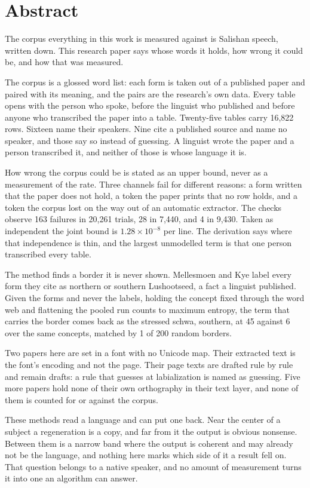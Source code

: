 \chapter*{Abstract}

The corpus everything in this work is measured against is Salishan speech, written down. This research paper
says whose words it holds, how wrong it could be, and how that was measured.

The corpus is a glossed word list: each form is taken out of a published paper and paired with its
meaning, and the pairs are the research's own data. Every table opens with the person who spoke,
before the linguist who published and before anyone who transcribed the paper into a table.
Twenty-five tables carry 16,822 rows. Sixteen name their speakers. Nine cite a published source and
name no speaker, and those say so instead of guessing. A linguist wrote the paper and a person transcribed it, and
neither of those is whose language it is.

How wrong the corpus could be is stated as an upper bound, never as a measurement of the rate.
Three channels fail for different reasons: a form written that the paper does not hold, a token the
paper prints that no row holds, and a token the corpus lost on the way out of an automatic extractor.
The checks observe 163 failures in 20,261 trials, 28 in 7,440, and 4 in 9,430. Taken as independent
the joint bound is $1.28 \times 10^{-8}$ per line. The derivation says where that independence is
thin, and the largest unmodelled term is that one person transcribed every table.

The method finds a border it is never shown. Mellesmoen and Kye label every form they cite as
northern or southern Lushootseed, a fact a linguist published. Given the forms and never the labels,
holding the concept fixed through the word web and flattening the pooled run counts to maximum
entropy, the term that carries the border comes back as the stressed schwa, southern, at 45 against 6
over the same concepts, matched by 1 of 200 random borders.

Two papers here are set in a font with no Unicode map. Their extracted text is the font's encoding
and not the page. Their page texts are drafted rule by rule and remain drafts: a rule that guesses at
labialization is named as guessing. Five more papers hold none of their own orthography in their
text layer, and none of them is counted for or against the corpus.

These methods read a language and can put one back. Near the center of a subject a regeneration is
a copy, and far from it the output is obvious nonsense. Between them is a narrow band where the
output is coherent and may already not be the language, and nothing here marks which side of it a
result fell on. That question belongs to a native speaker, and no amount of measurement turns it
into one an algorithm can answer.
\cleardoublepage
